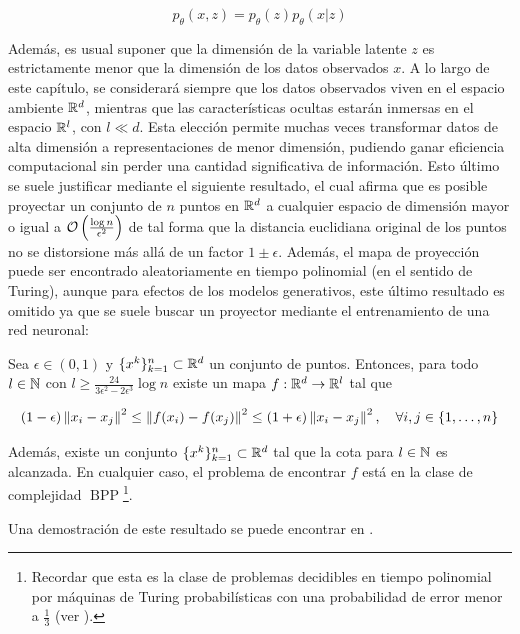 \begin{equation}
    \label{eq:latent_model}
    p_\theta(x,z)=p_\theta(z)p_\theta(x|z)
\end{equation}

Además, es usual suponer que la dimensión de la variable latente $z$ es estrictamente menor que la dimensión de los datos observados $x$. A lo largo de este capítulo, se considerará siempre que los datos observados viven en el espacio ambiente $\mathbb{R}^d$, mientras que las características ocultas estarán inmersas en el espacio $\mathbb{R}^l$, con $l\ll d$. Esta elección permite muchas veces transformar datos de alta dimensión a representaciones de menor dimensión, pudiendo ganar eficiencia computacional sin perder una cantidad significativa de información. Esto último se suele justificar mediante el siguiente resultado, el cual afirma que es posible proyectar un conjunto de $n$ puntos en $\mathbb{R}^d$ a cualquier espacio de dimensión mayor o igual a $\mathcal{O}\left(\frac{\log n}{\epsilon^2}\right)$ de tal forma que la distancia euclidiana original de los puntos no se distorsione más allá de un factor $1\pm\epsilon$. Además, el mapa de proyección puede ser encontrado aleatoriamente en tiempo polinomial (en el sentido de Turing), aunque para efectos de los modelos generativos, este último resultado es omitido ya que se suele buscar un proyector mediante el entrenamiento de una red neuronal:

\begin{teo}
    Sea $\epsilon\in (0,1)$ y $\{x^k\}_{k=1}^n\subset\mathbb{R}^d$ un conjunto de puntos. Entonces, para todo $l\in\mathbb{N}$ con $l\geq\frac{24}{3\epsilon^2 - 2\epsilon^3} \log n$ existe un mapa $f:\mathbb{R}^d\to\mathbb{R}^l$ tal que

    \begin{equation*}
        (1-\epsilon)\left\lVert x_i-x_j \right\rVert^2 \leq \left\lVert f(x_i)-f(x_j) \right\rVert^2 \leq (1+\epsilon)\left\lVert x_i-x_j \right\rVert^2, \quad\forall i,j\in\{1,\ldots,n\}
    \end{equation*}

    Además, existe un conjunto $\{x^k\}_{k=1}^n\subset\mathbb{R}^d$ tal que la cota para $l\in\mathbb{N}$ es alcanzada. En cualquier caso, el problema de encontrar $f$ está en la clase de complejidad $\operatorname{BPP}$\footnote{Recordar que esta es la clase de problemas decidibles en tiempo polinomial por máquinas de Turing probabilísticas con una probabilidad de error menor a $\frac{1}{3}$ (ver \cite{arora2009computational}).}.
\end{teo}

Una demostración de este resultado se puede encontrar en \cite{dasgupta2003elementary}.

